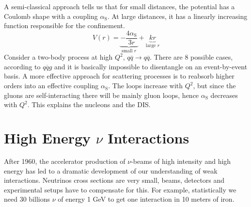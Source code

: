 \documentclass[10.75pt,a4paper,openright,bottom=2cm]{article}
\begin{document}
A semi-classical approach tells us that for small distances, the potential has a Coulomb shape with a coupling $\alpha_{\text{S}}$. At large distances, it has a linearly increasing function responsible for the confinement.
\[
V(r)=\underbrace{-\frac{4\alpha_{\text{S}}}{3r}}_{\text{small $r$}}+\underbrace{kr}_{\text{large $r$}}
\]
Consider a two-body process at high $Q^2$, $q\overline{q}\to q\overline{q}$. There are 8 possible cases, according to $q\overline{q}g$ and it is basically impossible to disentangle on an event-by-event basis. A more effective approach for scattering processes is to reabsorb higher orders into an effective coupling $\alpha_{\text{S}}$. The loops increase with $Q^2$, but since the gluons are self-interacting there will be mainly gluon loops, hence $\alpha_{\text{S}}$ decreases with $Q^2$. This explains the nucleons and the DIS.
\newpage
\section{High Energy $\nu$ Interactions}
After 1960, the accelerator production of $\nu$-beams of high intensity and high energy has led to a dramatic development of our understanding of weak interactions. Neutrinos cross sections are very small, beams, detectors and experimental setups have to compensate for this. For example, statistically we need 30 billions $\nu$ of energy 1 GeV to get one interaction in 10 meters of iron.
\end{document}
